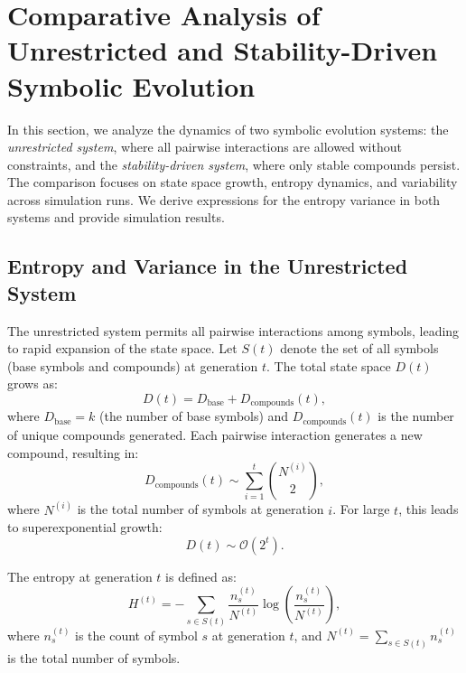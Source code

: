 \documentclass[%
 preprint, linenumbers,
 amsmath,amssymb,
 aps, physrev,
]{revtex4-2}
\begin{document}
\section{Comparative Analysis of Unrestricted and Stability-Driven Symbolic Evolution}

In this section, we analyze the dynamics of two symbolic evolution systems: the \textit{unrestricted system}, where all pairwise interactions are allowed without constraints, and the \textit{stability-driven system}, where only stable compounds persist. The comparison focuses on state space growth, entropy dynamics, and variability across simulation runs. We derive expressions for the entropy variance in both systems and provide simulation results.

\subsection{Entropy and Variance in the Unrestricted System}

The unrestricted system permits all pairwise interactions among symbols, leading to rapid expansion of the state space. Let \( S(t) \) denote the set of all symbols (base symbols and compounds) at generation \( t \). The total state space \( D(t) \) grows as:
\begin{equation}
    D(t) = D_\text{base} + D_\text{compounds}(t),
\end{equation}
where \( D_\text{base} = k \) (the number of base symbols) and \( D_\text{compounds}(t) \) is the number of unique compounds generated. Each pairwise interaction generates a new compound, resulting in:
\begin{equation}
    D_\text{compounds}(t) \sim \sum_{i=1}^t \binom{N^{(i)}}{2},
\end{equation}
where \( N^{(i)} \) is the total number of symbols at generation \( i \). For large \( t \), this leads to superexponential growth:
\begin{equation}
    D(t) \sim \mathcal{O}(2^t).
\end{equation}

The entropy at generation \( t \) is defined as:
\begin{equation}
    H^{(t)} = -\sum_{s \in S(t)} \frac{n_s^{(t)}}{N^{(t)}} \log \left( \frac{n_s^{(t)}}{N^{(t)}} \right),
\end{equation}
where \( n_s^{(t)} \) is the count of symbol \( s \) at generation \( t \), and \( N^{(t)} = \sum_{s \in S(t)} n_s^{(t)} \) is the total number of symbols.
\end{document}
